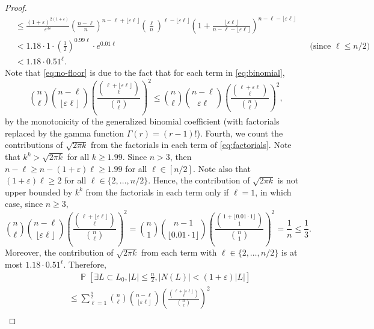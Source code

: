\documentclass[letterpaper, reqno,11pt]{article}
\newcommand{\PP}{\mathop{{}\mathbb{P}}}
\begin{document}
\begin{enumerate}
\begin{proof}
\begin{align}
      &\leq \frac{(1 + \varepsilon)^{2(1 + \varepsilon)}}{\varepsilon^{3\varepsilon}} \left(\frac{n - \ell}{n}\right)^{n - \ell + \lfloor \varepsilon \ell \rfloor} \left(\frac{\ell}{n}\right)^{\ell - \lfloor \varepsilon \ell \rfloor} \left(1 + \frac{\lfloor \varepsilon \ell \rfloor}{n - \ell - \lfloor \varepsilon \ell \rfloor}\right)^{n - \ell - \lfloor \varepsilon \ell \rfloor} \nonumber \\
      &< 1.18 \cdot 1 \cdot \left(\frac{1}{2}\right)^{0.99\ell} \cdot e^{0.01 \ell} && \text{(since $\ell \leq n/2$)} \nonumber \\
      &< 1.18 \cdot 0.51^\ell. \nonumber
    \end{align}
    Note that \eqref{eq:no-floor} is due to the fact that for each term in \eqref{eq:binomial},
    $$ \binom{n}{\ell} \binom{n - \ell}{\lfloor \varepsilon \ell \rfloor} \left(\frac{\binom{\ell + \lfloor \varepsilon \ell \rfloor}{\ell}}{\binom{n}{\ell}}\right)^2 \leq \binom{n}{\ell} \binom{n - \ell}{\varepsilon \ell} \left(\frac{\binom{\ell + \varepsilon \ell}{\ell}}{\binom{n}{\ell}}\right)^2, $$
    by the monotonicity of the generalized binomial coefficient (with factorials replaced by the gamma function $\Gamma(r) = (r - 1)!$). Fourth, we count the contributions of $\sqrt{2\pi k}$ from the factorials in each term of \eqref{eq:factorials}. Note that $k^k > \sqrt{2\pi k}$ for all $k \geq 1.99$. Since $n > 3$, then $n - \ell \geq n - (1 + \varepsilon) \ell \geq 1.99$ for all $\ell \in [n/2]$. Note also that $(1 + \varepsilon) \ell \geq 2$ for all $\ell \in \{ 2, \ldots, n/2 \}$. Hence, the contribution of $\sqrt{2\pi k}$ is not upper bounded by $k^k$ from the factorials in each term only if $\ell = 1$, in which case, since $n \geq 3$,
    $$ \binom{n}{\ell} \binom{n - \ell}{\lfloor \varepsilon \ell \rfloor} \left(\frac{\binom{\ell + \lfloor \varepsilon \ell \rfloor}{\ell}}{\binom{n}{\ell}}\right)^2 = \binom{n}{1} \binom{n - 1}{\lfloor 0.01 \cdot 1 \rfloor} \left(\frac{\binom{1 + \lfloor 0.01 \cdot 1 \rfloor}{1}}{\binom{n}{1}}\right)^2 = \frac{1}{n} \leq \frac{1}{3}. $$
    Moreover, the contribution of $\sqrt{2\pi k}$ from each term with $\ell \in \{ 2, \ldots, n/2 \}$ is at most $1.18 \cdot 0.51^\ell$. Therefore,
    \begin{align*}
      &\quad\, \PP\left[\exists L \subset L_0, |L| \leq \frac{n}{2}, |N(L)| < (1 + \varepsilon) |L|\right] \\
      &\leq \sum_{\ell = 1}^{\frac{n}{2}} \binom{n}{\ell} \binom{n - \ell}{\lfloor \varepsilon \ell \rfloor} \left(\frac{\binom{\ell + \lfloor \varepsilon \ell \rfloor}{\ell}}{\binom{n}{\ell}}\right)^2 \\

\end{align*}
\end{proof}
\end{enumerate}
\end{document}
